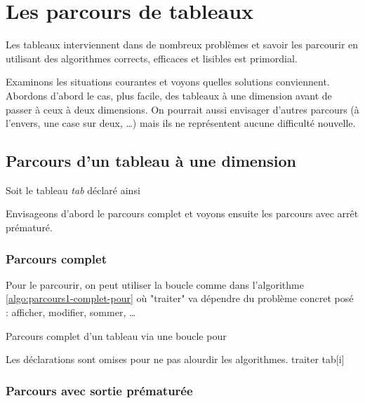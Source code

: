 \chapter{Les parcours de tableaux}

Les tableaux interviennent dans de nombreux problèmes 
et savoir les parcourir en utilisant des algorithmes
corrects, efficaces et lisibles est primordial.

Examinons les situations courantes et voyons quelles solutions conviennent.
Abordons d'abord le cas, plus facile, des tableaux à une dimension
avant de passer à ceux à deux dimensions.
On pourrait aussi envisager d'autres parcours
(à l'envers, une case sur deux, \dots) 
mais ils ne représentent aucune difficulté nouvelle.

\section{Parcours d'un tableau à une dimension}

Soit le tableau \textit{tab} déclaré ainsi


Envisageons d'abord le parcours complet
et voyons ensuite les parcours avec arrêt prématuré.

\subsection{Parcours complet}

Pour le parcourir, on peut utiliser la boucle 
comme dans l'algorithme \vref{algo:parcours1-complet-pour}
où "traiter" va dépendre du problème concret posé :
afficher, modifier, sommer, \dots

\begin{algorithm}[H]
\begin{pseudo}
	\caption{Parcours complet d'un tableau via une boucle pour}
	\label{algo:parcours1-complet-pour}
	\LComment Les déclarations sont omises pour ne pas alourdir les algorithmes.
		\Stmt traiter tab[i]
	\EndFor
\end{pseudo}
\end{algorithm}

\subsection{Parcours avec sortie prématurée}

